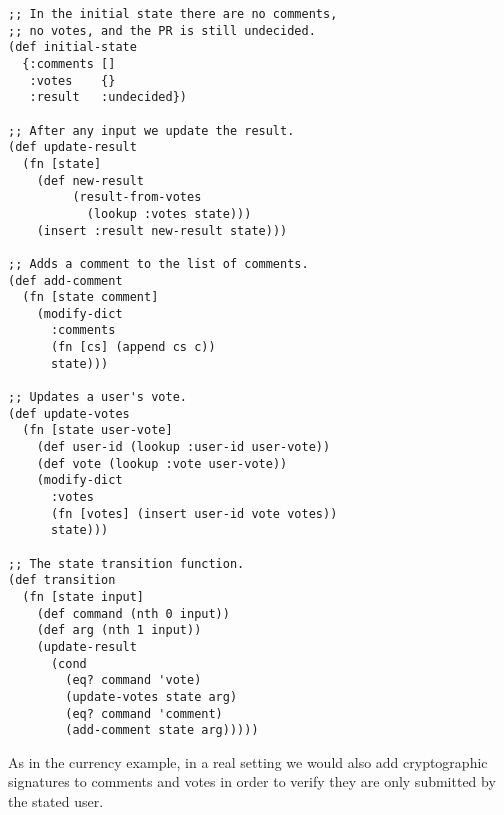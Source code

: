 \begin{lstlisting}
;; In the initial state there are no comments,
;; no votes, and the PR is still undecided.
(def initial-state
  {:comments []
   :votes    {}
   :result   :undecided})

;; After any input we update the result.
(def update-result
  (fn [state]
    (def new-result
         (result-from-votes
           (lookup :votes state)))
    (insert :result new-result state)))

;; Adds a comment to the list of comments.
(def add-comment
  (fn [state comment]
    (modify-dict
      :comments
      (fn [cs] (append cs c))
      state)))

;; Updates a user's vote.
(def update-votes
  (fn [state user-vote]
    (def user-id (lookup :user-id user-vote))
    (def vote (lookup :vote user-vote))
    (modify-dict
      :votes
      (fn [votes] (insert user-id vote votes))
      state)))

;; The state transition function.      
(def transition
  (fn [state input]
    (def command (nth 0 input))
    (def arg (nth 1 input))
    (update-result
      (cond
        (eq? command 'vote)
        (update-votes state arg)
        (eq? command 'comment)
        (add-comment state arg)))))
\end{lstlisting}

As in the currency example, in a real setting we would also add cryptographic
signatures to comments and votes in order to verify they are only submitted by
the stated user.
